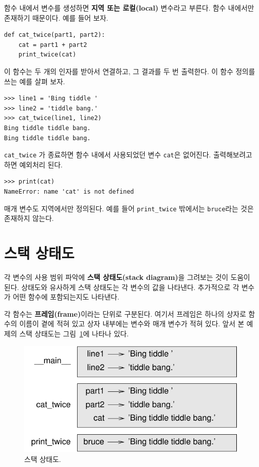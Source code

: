 \documentclass[10pt]{book}
\begin{document}
함수 내에서 변수를 생성하면 {\bf 지역 또는 로컬(local)} 변수라고
부른다.  함수 내에서만 존재하기 때문이다.  예를 들어 보자.

\begin{verbatim}
def cat_twice(part1, part2):
    cat = part1 + part2
    print_twice(cat)
\end{verbatim}
%
이 함수는 두 개의 인자를 받아서 연결하고, 그 결과를 두 번 출력한다.  이
함수 정의를 쓰는 예를 살펴 보자.

\begin{verbatim}
>>> line1 = 'Bing tiddle '
>>> line2 = 'tiddle bang.'
>>> cat_twice(line1, line2)
Bing tiddle tiddle bang.
Bing tiddle tiddle bang.
\end{verbatim}
%
\verb"cat_twice" 가 종료하면 함수 내에서 사용되었던 변수 {\tt cat}은
없어진다.  출력해보려고 하면 예외처리 된다.

\begin{verbatim}
>>> print(cat)
NameError: name 'cat' is not defined
\end{verbatim}
%
매개 변수도 지역에서만 정의된다. 예를 들어 \verb"print_twice" 밖에서는
{\tt bruce}라는 것은 존재하지 않는다.


\section{스택 상태도}
\label{stackdiagram}

각 변수의 사용 범위 파악에 {\bf 스택 상태도(stack diagram)}을 그려보는
것이 도움이 된다.  상태도와 유사하게 스택 상태도는 각 변수의 값을
나타낸다.  추가적으로 각 변수가 어떤 함수에 포함되는지도 나타낸다.

각 함수는 {\bf 프레임(frame)}이라는 단위로 구분된다.  여기서 프레임은
하나의 상자로 함수의 이름이 곁에 적혀 있고 상자 내부에는 변수와 매개
변수가 적혀 있다.  앞서 본 예제의 스택 상태도는
그림~\ref{fig.stack}에 나타나 있다.

\begin{figure}
\centerline
{\includegraphics[scale=0.8]{figs/stack.pdf}}
\caption{스택 상태도.}
\label{fig.stack}
\end{figure}
\end{document}
